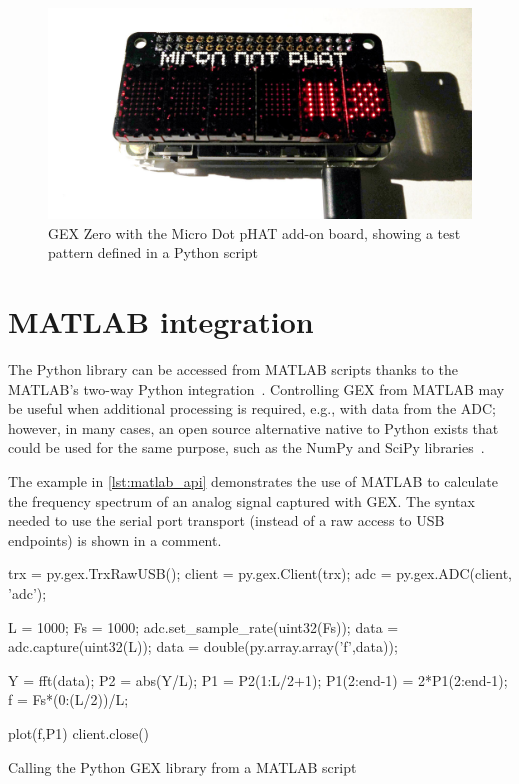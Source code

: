 \begin{figure}[h]
    \centering
    \includegraphics[width=.7\textwidth] {img/phatmtx.jpg}
    \caption{\label{fig:pydemo}GEX Zero with the Micro Dot pHAT add-on board, showing a test pattern defined in a Python script}
\end{figure}

\section{MATLAB integration}

The Python library can be accessed from MATLAB scripts thanks to the MATLAB's two-way Python integration~\cite{matlabpy}. Controlling GEX from MATLAB may be useful when additional processing is required, e.g., with data from the \gls{ADC}; however, in many cases, an open source alternative native to Python exists that could be used for the same purpose, such as the NumPy and SciPy libraries~\cite{numpyscipy}.

The example in \cref{lst:matlab_api} demonstrates the use of MATLAB to calculate the frequency spectrum of an analog signal captured with GEX. The syntax needed to use the serial port transport (instead of a raw access to USB endpoints) is shown in a comment.

\begin{listing}
	\begin{matlabcode}
	
	trx = py.gex.TrxRawUSB();
	client = py.gex.Client(trx);
	adc = py.gex.ADC(client, 'adc');
	
	L = 1000;
	Fs = 1000;
	adc.set_sample_rate(uint32(Fs)); %
	data = adc.capture(uint32(L));
	data = double(py.array.array('f',data)); %
	
	Y = fft(data);
	P2 = abs(Y/L);
	P1 = P2(1:L/2+1);
	P1(2:end-1) = 2*P1(2:end-1);
	f = Fs*(0:(L/2))/L;
	
	plot(f,P1)
	client.close()
	\end{matlabcode}
	\caption{\label{lst:matlab_api} Calling the Python GEX library from a MATLAB script}
\end{listing}


